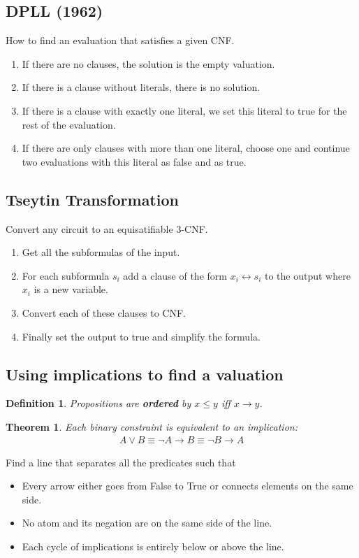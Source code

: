\documentclass{article}
\theoremstyle{sltheorem}
\newtheorem{definition}{Definition}
\newtheorem{theorem}{Theorem}
\begin{document}
\subsection{DPLL (1962)}
How to find an evaluation that satisfies a given CNF.
\begin{enumerate}
    \item If there are no clauses, the solution is the empty valuation.
    \item If there is a clause without literals, there is no solution.
    \item If there is a clause with exactly one literal, we set this literal to true for the rest of the evaluation.
    \item If there are only clauses with more than one literal, choose one and continue two evaluations with this literal as false and as true.
\end{enumerate}
\subsection{Tseytin Transformation}
Convert any circuit to an equisatifiable 3-CNF.
\begin{enumerate}
    \item Get all the subformulas of the input.
    \item For each subformula $s_i$ add a clause of the form $x_i \leftrightarrow s_i$ to the output where $x_i$ is a new variable.
    \item Convert each of these clauses to CNF.
    \item Finally set the output to true and simplify the formula.
\end{enumerate}
\subsection{Using implications to find a valuation}
\begin{definition}
    Propositions are \textbf{ordered} by $x\leq y$ iff $x\to y$.
\end{definition}
\begin{theorem}
    Each binary constraint is equivalent to an implication:
    \begin{align*}
        A \vee B \equiv \neg A \to B \equiv \neg B \to A
    \end{align*}
\end{theorem}
\noindent Find a line that separates all the predicates such that
\begin{itemize}
    \item Every arrow either goes from False to True or connects elements on the same side.
    \item No atom and its negation are on the same side of the line.
    \item Each cycle of implications is entirely below or above the line.
\end{itemize}
\end{document}
